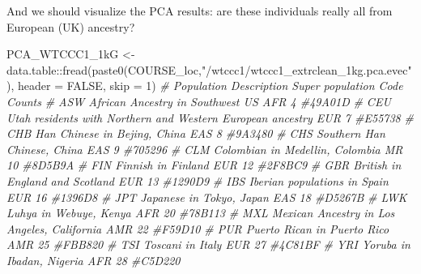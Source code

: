 \documentclass[
]{book}
\newenvironment{Shaded}{\begin{snugshade}}{\end{snugshade}}
\newcommand{\AttributeTok}[1]{\textcolor[rgb]{0.77,0.63,0.00}{#1}}
\newcommand{\CommentTok}[1]{\textcolor[rgb]{0.56,0.35,0.01}{\textit{#1}}}
\newcommand{\ConstantTok}[1]{\textcolor[rgb]{0.00,0.00,0.00}{#1}}
\newcommand{\DecValTok}[1]{\textcolor[rgb]{0.00,0.00,0.81}{#1}}
\newcommand{\FunctionTok}[1]{\textcolor[rgb]{0.00,0.00,0.00}{#1}}
\newcommand{\NormalTok}[1]{#1}
\newcommand{\OtherTok}[1]{\textcolor[rgb]{0.56,0.35,0.01}{#1}}
\newcommand{\SpecialCharTok}[1]{\textcolor[rgb]{0.00,0.00,0.00}{#1}}
\newcommand{\StringTok}[1]{\textcolor[rgb]{0.31,0.60,0.02}{#1}}
\begin{document}
And we should visualize the PCA results: are these individuals really all from European (UK) ancestry?

\begin{Shaded}
\begin{Highlighting}[]
\NormalTok{PCA\_WTCCC1\_1kG }\OtherTok{\textless{}{-}}\NormalTok{ data.table}\SpecialCharTok{::}\FunctionTok{fread}\NormalTok{(}\FunctionTok{paste0}\NormalTok{(COURSE\_loc,}\StringTok{"/wtccc1/wtccc1\_extrclean\_1kg.pca.evec"}\NormalTok{), }\AttributeTok{header =} \ConstantTok{FALSE}\NormalTok{, }\AttributeTok{skip =} \DecValTok{1}\NormalTok{)}
\CommentTok{\# Population    Description Super population    Code    Counts}
\CommentTok{\# ASW   African Ancestry in Southwest US                              AFR   4     \#49A01D}
\CommentTok{\# CEU   Utah residents with Northern and Western European ancestry  EUR 7     \#E55738}
\CommentTok{\# CHB   Han Chinese in Bejing, China                                  EAS   8     \#9A3480}
\CommentTok{\# CHS   Southern Han Chinese, China                                 EAS 9     \#705296}
\CommentTok{\# CLM   Colombian in Medellin, Colombia                             MR  10    \#8D5B9A}
\CommentTok{\# FIN   Finnish in Finland                                          EUR 12  \#2F8BC9}
\CommentTok{\# GBR   British in England and Scotland                             EUR 13  \#1290D9}
\CommentTok{\# IBS   Iberian populations in Spain                                  EUR   16  \#1396D8}
\CommentTok{\# JPT   Japanese in Tokyo, Japan                                      EAS   18  \#D5267B}
\CommentTok{\# LWK   Luhya in Webuye, Kenya                                      AFR 20  \#78B113}
\CommentTok{\# MXL   Mexican Ancestry in Los Angeles, California                 AMR 22  \#F59D10}
\CommentTok{\# PUR   Puerto Rican in Puerto Rico                                 AMR 25  \#FBB820}
\CommentTok{\# TSI   Toscani in Italy                                              EUR   27  \#4C81BF}
\CommentTok{\# YRI   Yoruba in Ibadan, Nigeria                                     AFR   28  \#C5D220}


\end{Highlighting}
\end{Shaded}
\end{document}
